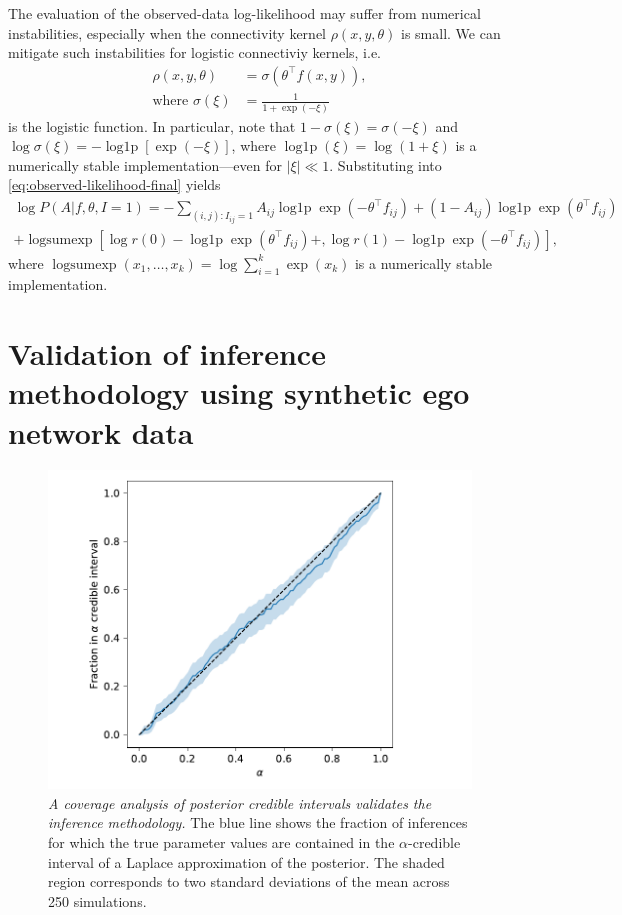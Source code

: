 \documentclass{scrartcl}
\newcommand{\expit}{\sigma}
\newcommand{\transpose}[1]{#1^\intercal}
\DeclareMathOperator{\logp}{log1p}
\DeclareMathOperator{\logsumexp}{logsumexp}
\newcommand{\abs}[1]{\left|#1\right|}
\newcommand{\titlecaption}[2]{\caption[#1]{\emph{#1} #2}}
\begin{document}
The evaluation of the observed-data log-likelihood may suffer from numerical instabilities, especially when the connectivity kernel $\rho(x, y, \theta)$ is small. We can mitigate such instabilities for logistic connectiviy kernels, i.e.
\begin{align}
    \rho(x,y,\theta)&=\expit(\transpose{\theta}f(x,y)),\\
    \text{where }\expit(\xi)&=\frac{1}{1+\exp(-\xi)}
\end{align}
is the logistic function. In particular, note that $1 - \expit(\xi) = \expit(-\xi)$ and $\log\expit(\xi)=-\logp\left[\exp(-\xi)\right]$, where $\logp(\xi)=\log(1 + \xi)$ is a numerically stable implementation---even for $\abs{\xi}\ll 1$. Substituting into \cref{eq:observed-likelihood-final} yields
\begin{multline}
    \log P(A|f,\theta,I=1)= -\sum_{(i,j):I_{ij}=1} A_{ij}\logp\exp\left(-\transpose{\theta}f_{ij}\right)+\left(1-A_{ij}\right)\logp\exp\left(\transpose{\theta}f_{ij}\right) \\
    + \logsumexp\left[\log r(0) - \logp\exp\left(\transpose{\theta}f_{ij}\right) + ,\log r(1)-\logp\exp\left(-\transpose{\theta}f_{ij}\right)\right],
\end{multline}
where $\logsumexp(x_1, \ldots, x_k)=\log\sum_{i=1}^k\exp(x_k)$ is a numerically stable implementation.

\section{Validation of inference methodology using synthetic ego network data\label{app:inference-validation}}

\begin{figure}
    \includegraphics{credible-coverage}
    \titlecaption{A coverage analysis of posterior credible intervals validates the inference methodology.}{The blue line shows the fraction of inferences for which the true parameter values are contained in the $\alpha$-credible interval of a Laplace approximation of the posterior. The shaded region corresponds to two standard deviations of the mean across 250 simulations.\label{fig:credible-coverage}}
\end{figure}
\end{document}
